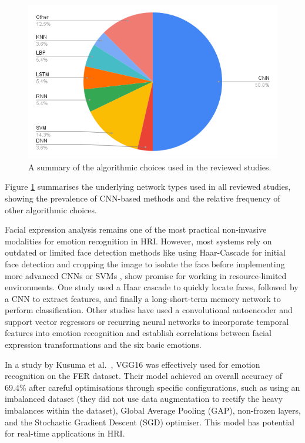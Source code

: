 \begin{figure}[!htb]
    \centering{}
    \includegraphics[scale=0.50]{lit_review_images/chartFaceModelUsage.png}
    \caption{A summary of the algorithmic choices used in the reviewed studies.}
    \label{figure:alorithmUsage}
\end{figure}

Figure \ref{figure:alorithmUsage} summarises the underlying network types used in all reviewed studies, showing the prevalence of CNN-based methods and the relative frequency of other algorithmic choices.

Facial expression analysis remains one of the most practical non-invasive modalities for emotion recognition in HRI. However, most systems rely on outdated or limited face detection methods like using Haar-Cascade for initial face detection and cropping the image to isolate the face before implementing more advanced CNNs \cite{Appuhamy2018-dc} or SVMs \cite{Gupta2018-af} \cite{Rosula_Reyes2020-yz}, show promise for working in resource-limited environments. One study used a Haar cascade to quickly locate faces, followed by a CNN to extract features, and finally a long-short-term memory network \cite{8760246} to perform classification. Other studies have used a convolutional autoencoder and support vector regressors \cite{Allognon2020-um} or recurring neural networks \cite{Brandizzi2021AutomaticRI} to incorporate temporal features into emotion recognition and establish correlations between facial expression transformations and the six basic emotions.

In a study by Kusuma et al.\ \cite{Kusuma2020-oa}, VGG16 was effectively used for emotion recognition on the FER dataset. Their model achieved an overall accuracy of 69.4\% after careful optimisations through specific configurations, such as using an imbalanced dataset (they did not use data augmentation to rectify the heavy imbalances within the dataset), Global Average Pooling (GAP), non-frozen layers, and the Stochastic Gradient Descent (SGD) optimiser. This model has potential for real-time applications in HRI.

